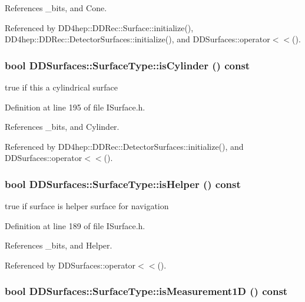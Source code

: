 References \_\-bits, and Cone.

Referenced by DD4hep::DDRec::Surface::initialize(), DD4hep::DDRec::DetectorSurfaces::initialize(), and DDSurfaces::operator$<$$<$().\hypertarget{class_d_d_surfaces_1_1_surface_type_a590a029489e8d61324c633072b883609}{
\subsubsection[{isCylinder}]{\setlength{\rightskip}{0pt plus 5cm}bool DDSurfaces::SurfaceType::isCylinder () const}}
\label{class_d_d_surfaces_1_1_surface_type_a590a029489e8d61324c633072b883609}


true if this a cylindrical surface 

Definition at line 195 of file ISurface.h.

References \_\-bits, and Cylinder.

Referenced by DD4hep::DDRec::DetectorSurfaces::initialize(), and DDSurfaces::operator$<$$<$().\hypertarget{class_d_d_surfaces_1_1_surface_type_ad6fc85f3eb2522703ec7819bccae04df}{
\subsubsection[{isHelper}]{\setlength{\rightskip}{0pt plus 5cm}bool DDSurfaces::SurfaceType::isHelper () const}}
\label{class_d_d_surfaces_1_1_surface_type_ad6fc85f3eb2522703ec7819bccae04df}


true if surface is helper surface for navigation 

Definition at line 189 of file ISurface.h.

References \_\-bits, and Helper.

Referenced by DDSurfaces::operator$<$$<$().\hypertarget{class_d_d_surfaces_1_1_surface_type_accd1fdafbf7d6235ec1945af6347043a}{
\subsubsection[{isMeasurement1D}]{\setlength{\rightskip}{0pt plus 5cm}bool DDSurfaces::SurfaceType::isMeasurement1D () const}}
\label{class_d_d_surfaces_1_1_surface_type_accd1fdafbf7d6235ec1945af6347043a}


